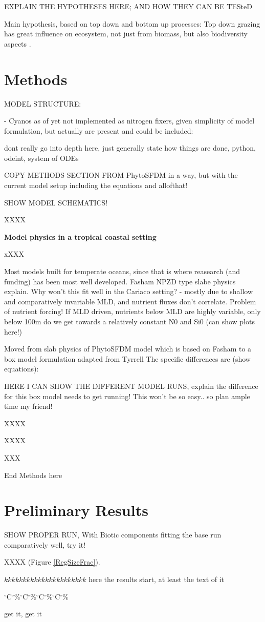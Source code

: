 EXPLAIN THE HYPOTHESES HERE; AND HOW THEY CAN BE TESteD

Main hypothesis, based on top down and bottom up processes:
Top down grazing has great influence on ecosystem, not just from biomass, but also biodiversity aspects \cite{Prowe2012c}.


\section{Methods}

MODEL STRUCTURE: 

- Cyanos as of yet not implemented as nitrogen fixers, given simplicity of model formulation, but actually are present and could be included: \citep{Montes2013}

dont really go into depth here, just generally state how things are done, python, odeint, system of ODEs

COPY METHODS SECTION FROM PhytoSFDM in a way, but with the current model setup
including the equations and allofthat!

SHOW MODEL SCHEMATICS!

XXXX

\small {\textbf{Model physics in a tropical coastal setting}}

xXXX

Most models built for temperate oceans, since that is where reasearch (and funding) has been most well developed. Fasham NPZD type slabe physics explain.
Why won't this fit well in the Cariaco setting? - mostly due to shallow and comparatively invariable MLD, and nutrient fluxes don't correlate.
Problem of nutrient forcing! If MLD driven, nutrients below MLD are highly variable, only below 100m do we get towards a relatively constant N0 and Si0 (can show plots here!)

Moved from slab physics of PhytoSFDM model \citep{Acevedo-Trejos2016} which is based on Fasham \citep{Evans2003,Fasham1990a} to a box model formulation adapted from Tyrrell \citep{Tyrrell1999}
The specific differences are (show equations):

HERE I CAN SHOW THE DIFFERENT MODEL RUNS, explain the difference
for this box model needs to get running! This won't be so easy.. so plan ample time my friend!

XXXX

XXXX

XXX


End Methods here

\section{Preliminary Results}


SHOW PROPER RUN, With Biotic components fitting the base run comparatively well, try it!

XXXX (Figure \ref{RegSizeFrac}).



$kkkkkkkkkkkkkkkkkkkkkk$ here the results start, at least the text of it

$^{\circ}$C$^{\circ}$\%$^{\circ}$C$^{\circ}$\%$^{\circ}$C$^{\circ}$\%$^{\circ}$C$^{\circ}$\%


get it, get it




